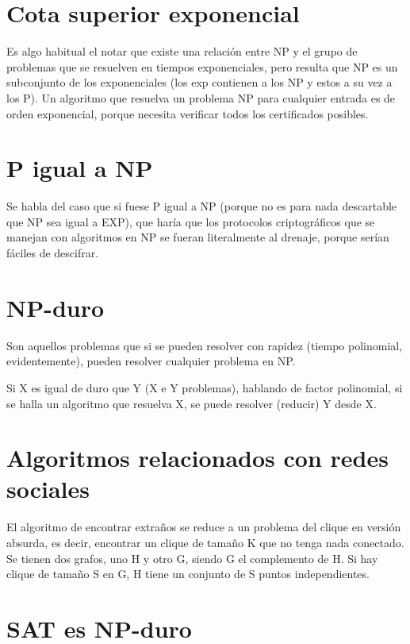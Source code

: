 \documentclass[a4paper]{article}
\begin{document}
\section{Cota superior exponencial}

Es algo habitual el notar que existe una relación entre NP y el grupo de problemas que se resuelven en tiempos exponenciales, pero resulta que NP es un subconjunto de los exponenciales (los exp contienen a los NP y estos a su vez a los P). Un algoritmo que resuelva un problema NP para cualquier entrada es de orden exponencial, porque necesita verificar todos los certificados posibles. 

\section{P igual a NP}

Se habla del caso que si fuese P igual a NP (porque no es para nada descartable que NP sea igual a EXP), que haría que los protocolos criptográficos que se manejan con algoritmos en NP se fueran literalmente al drenaje, porque serían fáciles de descifrar. 

\section{NP-duro}

Son aquellos problemas que si se pueden resolver con rapidez (tiempo polinomial, evidentemente), pueden resolver cualquier problema en NP. 

Si X es igual de duro que Y (X e Y problemas), hablando de factor polinomial, si se halla un algoritmo que resuelva X, se puede resolver (reducir) Y desde X.

\section{Algoritmos relacionados con redes sociales}

El algoritmo de encontrar extraños se reduce a un problema del clique en versión absurda, es decir, encontrar un clique de tamaño K que no tenga nada conectado. Se tienen dos grafos, uno H y otro G, siendo G el complemento de H. Si hay clique de tamaño S en G, H tiene un conjunto de S puntos independientes.

\section{SAT es NP-duro}
\end{document}
